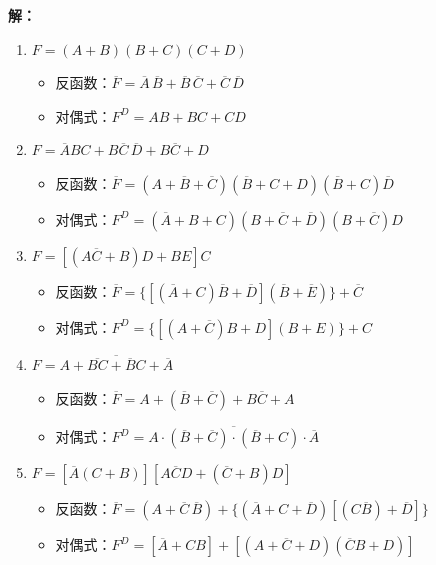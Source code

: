 \documentclass[10pt, a4paper]{article}
\newcommand{\solution}[1]{
    \noindent\textbf{解：}{\songti #1} \par\vspace{3ex}
}
\begin{document}
\solution{
\begin{enumerate}
    \item $F = (A+B)(B+C)(C+D)$
    \begin{itemize}
        \item 反函数：$\overline{F} = \overline{A}\,\overline{B} + \overline{B}\,\overline{C} + \overline{C}\,\overline{D}$
        \item 对偶式：$F^D = AB + BC + CD$
    \end{itemize}

    \item $F = \overline{A}BC + B\overline{C}\,\overline{D} + B\overline{C} + D$
    \begin{itemize}
        \item 反函数：$\overline{F} = (A + \overline{B} + \overline{C})(\overline{B} + C + D)(\overline{B} + C)\overline{D}$
        \item 对偶式：$F^D = (\overline{A} + B + C)(B + \overline{C} + \overline{D})(B + \overline{C})D$
    \end{itemize}

    \item $F = [(A\overline{C} + B)D + BE]C$
    \begin{itemize}
        \item 反函数：$\overline{F} = \{[(\overline{A} + C)\overline{B} + \overline{D}](\overline{B} + \overline{E})\} + \overline{C}$
        \item 对偶式：$F^D = \{[(A + \overline{C})B + D](B + E)\} + C$
    \end{itemize}

    \item $F = \overline{A + \overline{BC} + \overline{B}C + \overline{A}}$
    \begin{itemize}
        \item 反函数：$\overline{F} = A + (\overline{B} + \overline{C}) + B\overline{C} + A$
        \item 对偶式：$F^D = \overline{A \cdot (\overline{B} + \overline{C}) \cdot (\overline{B} + C) \cdot \overline{A}}$
    \end{itemize}

    \item $F = [\overline{A}(C + B)][A\overline{C}D + (\overline{C} + B)D]$
    \begin{itemize}
        \item 反函数：$\overline{F} = (A + \overline{C}\,\overline{B}) + \{(\overline{A} + C + \overline{D})[(C\overline{B}) + \overline{D}]\}$
        \item 对偶式：$F^D = [\overline{A} + CB] + [(A + \overline{C} + D)(\overline{C}B + D)]$
    \end{itemize}


\end{enumerate}}
\end{document}
